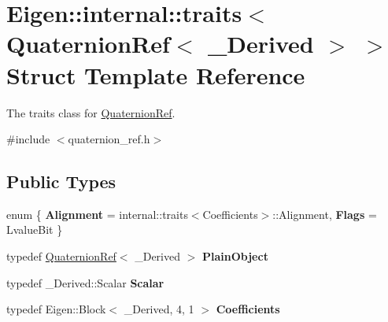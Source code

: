 \hypertarget{structEigen_1_1internal_1_1traits_3_01QuaternionRef_3_01__Derived_01_4_01_4}{}\section{Eigen\+:\+:internal\+:\+:traits$<$ Quaternion\+Ref$<$ \+\_\+\+Derived $>$ $>$ Struct Template Reference}
\label{structEigen_1_1internal_1_1traits_3_01QuaternionRef_3_01__Derived_01_4_01_4}


The traits class for \hyperlink{classEigen_1_1QuaternionRef}{Quaternion\+Ref}.  




{\ttfamily \#include $<$quaternion\+\_\+ref.\+h$>$}

\subsection*{Public Types}
\begin{DoxyCompactItemize}
\item 
enum \{ {\bfseries Alignment} = internal\+:\+:traits$<$Coefficients$>$\+:\+:Alignment, 
{\bfseries Flags} = Lvalue\+Bit
 \}\hypertarget{structEigen_1_1internal_1_1traits_3_01QuaternionRef_3_01__Derived_01_4_01_4_a4f93817c12808aad94deecaa1ff3ba2d}{}\label{structEigen_1_1internal_1_1traits_3_01QuaternionRef_3_01__Derived_01_4_01_4_a4f93817c12808aad94deecaa1ff3ba2d}

\item 
typedef \hyperlink{classEigen_1_1QuaternionRef}{Quaternion\+Ref}$<$ \+\_\+\+Derived $>$ {\bfseries Plain\+Object}\hypertarget{structEigen_1_1internal_1_1traits_3_01QuaternionRef_3_01__Derived_01_4_01_4_afb4148e5066544aadd54ebee6c0a6f5d}{}\label{structEigen_1_1internal_1_1traits_3_01QuaternionRef_3_01__Derived_01_4_01_4_afb4148e5066544aadd54ebee6c0a6f5d}

\item 
typedef \+\_\+\+Derived\+::\+Scalar {\bfseries Scalar}\hypertarget{structEigen_1_1internal_1_1traits_3_01QuaternionRef_3_01__Derived_01_4_01_4_a24e9f1afdf166a5dd1f61db147199699}{}\label{structEigen_1_1internal_1_1traits_3_01QuaternionRef_3_01__Derived_01_4_01_4_a24e9f1afdf166a5dd1f61db147199699}

\item 
typedef Eigen\+::\+Block$<$ \+\_\+\+Derived, 4, 1 $>$ {\bfseries Coefficients}\hypertarget{structEigen_1_1internal_1_1traits_3_01QuaternionRef_3_01__Derived_01_4_01_4_a2eb1c923a6451a17be2966e89306eae3}{}\label{structEigen_1_1internal_1_1traits_3_01QuaternionRef_3_01__Derived_01_4_01_4_a2eb1c923a6451a17be2966e89306eae3}

\end{DoxyCompactItemize}


